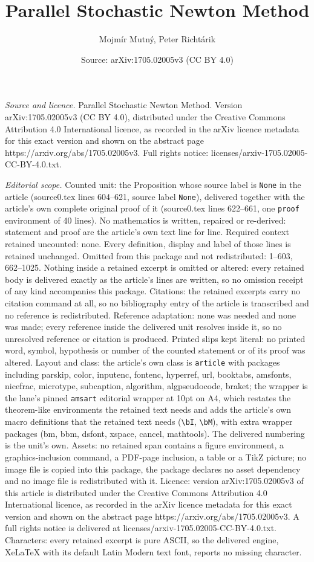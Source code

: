 \documentclass[10pt,a4paper]{amsart}
\title[Parallel Stochastic Newton Method]{Parallel Stochastic Newton Method}
\author{Mojm\'ir Mutn\'y, Peter Richt\'arik}
\date{Source: arXiv:1705.02005v3 (CC BY 4.0)}
\begin{document}
\maketitle

\noindent\emph{Source and licence.} Parallel Stochastic Newton Method. Version arXiv:1705.02005v3 (CC BY 4.0), distributed under the Creative Commons Attribution 4.0 International licence, as recorded in the arXiv licence metadata for this exact version and shown on the abstract page https://arxiv.org/abs/1705.02005v3. Full rights notice: licenses/arxiv-1705.02005-CC-BY-4.0.txt.\par\smallskip

\noindent\textit{Editorial scope.} Counted unit: the Proposition whose source label is \texttt{None} in the article (source0.tex lines 604--621, source label \texttt{None}), delivered together with the article's own complete original proof of it (source0.tex lines 622--661, one \texttt{proof} environment of 40 lines). No mathematics is written, repaired or re-derived: statement and proof are the article's own text line for line. Required context retained uncounted: none. Every definition, display and label of those lines is retained unchanged. Omitted from this package and not redistributed: 1--603, 662--1025. Nothing inside a retained excerpt is omitted or altered: every retained body is delivered exactly as the article's lines are written, so no omission receipt of any kind accompanies this package. Citations: the retained excerpts carry no citation command at all, so no bibliography entry of the article is transcribed and no reference is redistributed. Reference adaptation: none was needed and none was made; every reference inside the delivered unit resolves inside it, so no unresolved reference or citation is produced. Printed slips kept literal: no printed word, symbol, hypothesis or number of the counted statement or of its proof was altered. Layout and class: the article's own class is \texttt{article} with packages including parskip, color, inputenc, fontenc, hyperref, url, booktabs, amsfonts, nicefrac, microtype, subcaption, algorithm, algpseudocode, braket; the wrapper is the lane's pinned \texttt{amsart} editorial wrapper at 10pt on A4, which restates the theorem-like environments the retained text needs and adds the article's own macro definitions that the retained text needs (\texttt{\textbackslash bI}, \texttt{\textbackslash bM}), with extra wrapper packages (bm, bbm, dsfont, xspace, cancel, mathtools). The delivered numbering is the unit's own. Assets: no retained span contains a figure environment, a graphics-inclusion command, a PDF-page inclusion, a table or a TikZ picture; no image file is copied into this package, the package declares no asset dependency and no image file is redistributed with it. Licence: version arXiv:1705.02005v3 of this article is distributed under the Creative Commons Attribution 4.0 International licence, as recorded in the arXiv licence metadata for this exact version and shown on the abstract page https://arxiv.org/abs/1705.02005v3. A full rights notice is delivered at licenses/arxiv-1705.02005-CC-BY-4.0.txt. Characters: every retained excerpt is pure ASCII, so the delivered engine, XeLaTeX with its default Latin Modern text font, reports no missing character.
\end{document}
